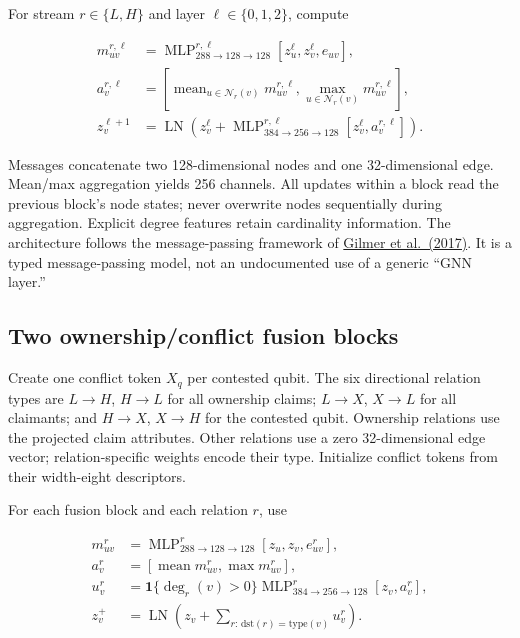 \documentclass[10pt,a4paper]{article}
\begin{document}
For stream \(r\in\{L,H\}\) and layer \(\ell\in\{0,1,2\}\), compute

\[
\begin{aligned}
m_{uv}^{r,\ell}&=\operatorname{MLP}^{r,\ell}_{288\to128\to128}
[z_u^\ell,z_v^\ell,e_{uv}],\\
a_v^{r,\ell}&=[\operatorname{mean}_{u\in\mathcal N_r(v)}m_{uv}^{r,\ell},
\operatorname{max}_{u\in\mathcal N_r(v)}m_{uv}^{r,\ell}],\\
z_v^{\ell+1}&=\operatorname{LN}\left(z_v^\ell+
\operatorname{MLP}^{r,\ell}_{384\to256\to128}[z_v^\ell,a_v^{r,\ell}]\right).
\end{aligned}
\tag{6}
\]

Messages concatenate two 128-dimensional nodes and one 32-dimensional
edge. Mean/max aggregation yields 256 channels. All updates within a
block read the previous block's node states; never overwrite nodes
sequentially during aggregation. Explicit degree features retain
cardinality information. The architecture follows the message-passing
framework of
\href{https://proceedings.mlr.press/v70/gilmer17a.html}{Gilmer et
al.~(2017)}. It is a typed message-passing model, not an undocumented
use of a generic ``GNN layer.''

\hypertarget{two-ownershipconflict-fusion-blocks}{%
\subsection{Two ownership/conflict fusion
blocks}\label{two-ownershipconflict-fusion-blocks}}

Create one conflict token \(X_q\) per contested qubit. The six
directional relation types are \(L\to H\), \(H\to L\) for all ownership
claims; \(L\to X\), \(X\to L\) for all claimants; and \(H\to X\),
\(X\to H\) for the contested qubit. Ownership relations use the
projected claim attributes. Other relations use a zero 32-dimensional
edge vector; relation-specific weights encode their type. Initialize
conflict tokens from their width-eight descriptors.

For each fusion block and each relation \(r\), use

\[
\begin{aligned}
m_{uv}^{r}&=\operatorname{MLP}^{r}_{288\to128\to128}[z_u,z_v,e_{uv}^{r}],\\
a_v^{r}&=[\operatorname{mean}m_{uv}^{r},\operatorname{max}m_{uv}^{r}],\\
u_v^r&=\mathbf1\{\deg_r(v)>0\}
\operatorname{MLP}^{r}_{384\to256\to128}[z_v,a_v^r],\\
z_v^+&=\operatorname{LN}\left(z_v+\sum_{r:\,\mathrm{dst}(r)=\mathrm{type}(v)}u_v^r\right).
\end{aligned}
\tag{7}
\]
\end{document}
